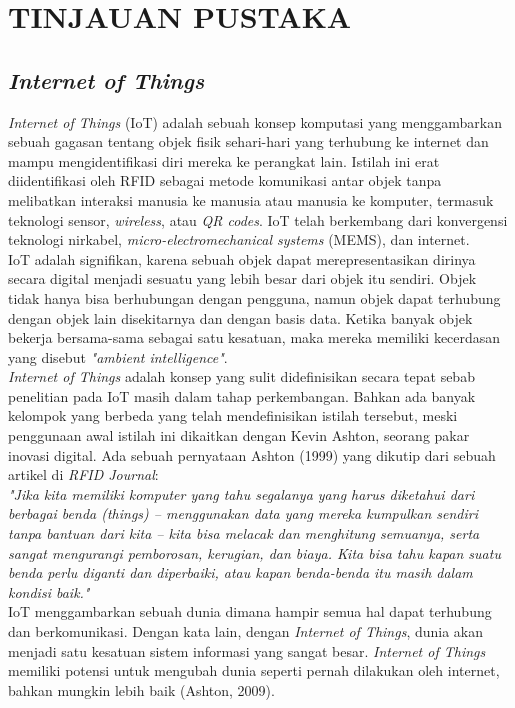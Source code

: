 \chapter{TINJAUAN PUSTAKA}
\section{\textit{Internet of Things}}
\tab \textit{Internet of Things} (IoT) adalah sebuah konsep komputasi yang menggambarkan sebuah gagasan tentang objek fisik sehari-hari yang terhubung ke internet dan mampu mengidentifikasi diri mereka ke perangkat lain. Istilah ini erat diidentifikasi oleh RFID sebagai metode komunikasi antar objek tanpa melibatkan interaksi manusia ke manusia atau manusia ke komputer, termasuk teknologi sensor, \textit{wireless}, atau \textit{QR codes}. IoT telah berkembang dari konvergensi teknologi nirkabel, \textit{micro-electromechanical systems} (MEMS), dan internet.\\
\tab IoT adalah signifikan, karena sebuah objek dapat merepresentasikan dirinya secara digital menjadi sesuatu yang lebih besar dari objek itu sendiri. Objek tidak hanya bisa berhubungan dengan pengguna, namun objek dapat terhubung dengan objek lain disekitarnya dan dengan basis data. Ketika banyak objek bekerja bersama-sama sebagai satu kesatuan, maka mereka memiliki kecerdasan yang disebut \textit{"ambient intelligence"}.\\
\tab \textit{Internet of Things} adalah konsep yang sulit didefinisikan secara tepat sebab penelitian pada IoT masih dalam tahap perkembangan. Bahkan ada banyak kelompok yang berbeda yang telah mendefinisikan istilah tersebut, meski penggunaan awal istilah ini dikaitkan dengan Kevin Ashton, seorang pakar inovasi digital. Ada sebuah pernyataan Ashton (1999) yang dikutip dari sebuah artikel di \textit{RFID Journal}:\\
\tab \textit{"Jika kita memiliki komputer yang tahu segalanya yang harus diketahui dari berbagai benda \textit{(things)} – menggunakan data yang mereka kumpulkan sendiri tanpa bantuan dari kita – kita bisa melacak dan menghitung semuanya, serta sangat mengurangi pemborosan, kerugian, dan biaya. Kita bisa tahu kapan suatu benda perlu diganti dan diperbaiki, atau kapan benda-benda itu masih dalam kondisi baik."}\\
\tab IoT menggambarkan sebuah dunia dimana hampir semua hal dapat terhubung dan berkomunikasi. Dengan kata lain, dengan \textit{Internet of Things}, dunia akan menjadi satu kesatuan sistem informasi yang sangat besar. \textit{Internet of Things} memiliki potensi untuk mengubah dunia seperti pernah dilakukan oleh internet, bahkan mungkin lebih baik (Ashton, 2009).


